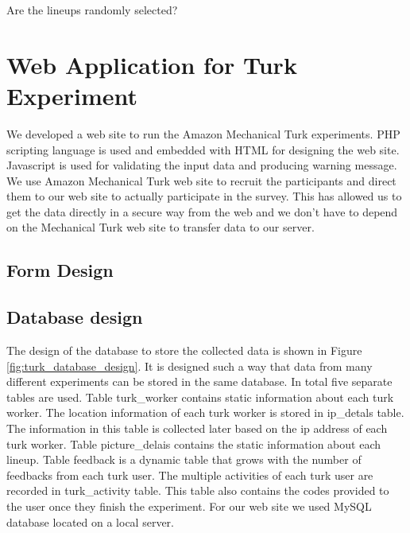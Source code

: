 \documentclass[11pt]{article}
\begin{document}
Are the lineups randomly selected?

 


\section{Web Application for Turk Experiment} We developed a web site to run the Amazon Mechanical Turk experiments.  PHP scripting language is used and embedded with HTML for designing the web site. Javascript is used for validating the input data and producing warning message.  We use  Amazon Mechanical Turk web site to recruit the participants and direct them to our web site to actually participate in the survey. This has allowed us to get the data directly in a secure way from the web and we don't have to depend on the Mechanical Turk web site to transfer data to our server. 

\subsection{Form Design}

\subsection{Database design} The design of the database to store the collected data is shown in Figure \ref{fig:turk_database_design}. It is designed such a way that data from many different experiments can be stored in the same database. In total five separate tables are used. Table turk\_worker contains static information about each turk worker. The location information of each turk worker is stored in ip\_detals table. The information in this table is collected later based on the ip address of each turk worker. Table picture\_delais contains the static information about each lineup. Table feedback is a dynamic table that grows with the number of feedbacks from each turk user. The multiple activities of each turk user are recorded in turk\_activity table. This table also contains the codes provided to the user once they finish the experiment. For our web site we used MySQL database located on a local server.
\end{document}
